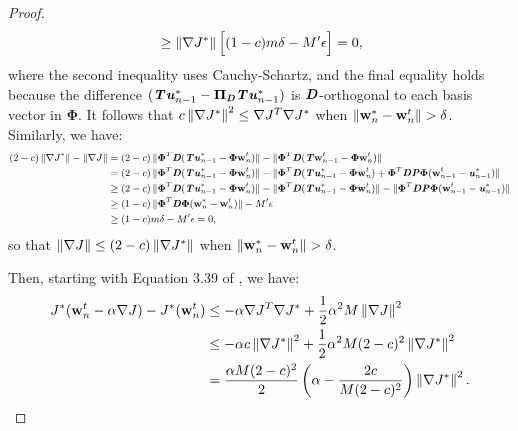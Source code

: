 \documentclass{article}
\renewcommand{\vec}[1]{\textbf{\textit{#1}}}
\newcommand{\target}{\vec{u}}
\newcommand{\params}{\textbf{w}}
\newcommand{\Features}{\bm{\Phi}}
\newcommand{\transitionmtx}{\textbf{\textit{P}}}
\newcommand{\projectionmtx}{\bm{\Pi}}
\newcommand{\densitymtx}{\textbf{\textit{D}}}
\newcommand{\bellmanop}{\textbf{\textit{T}}}
\newcommand{\smashednorm}[1]{\left\lVert \smash{#1} \right\rVert}
\begin{document}
\begin{proof}
\begin{equation}
\begin{split}
	&\geq \smashednorm{\nabla J^*	}\Big[(1 - c)m\delta  - M'\epsilon\Big] = 0,\\
	\end{split}
	\end{equation}
	where the second inequality uses Cauchy-Schartz, and the final equality holds because the difference $(\bellmanop\target^*_{n-1} - \projectionmtx_\densitymtx\bellmanop\target^*_{n-1})$ is $\densitymtx$-orthogonal to each basis vector in $\Features$. It follows that $c\smashednorm{\nabla J^*	}^2 \leq \nabla J^T\nabla J^*$ when $\smashednorm{\params_n^* - \params_n^t} > \delta$. Similarly, we have:
	\begin{equation*}
	\small
	\begin{split}
	(2 - c)\smashednorm{\nabla J^*} - \smashednorm{\nabla J} &= (2 - c)\smashednorm{\Features^T\densitymtx(\bellmanop\target^*_{n-1} - \Features\params_n^t)} - \smashednorm{\Features^T\densitymtx(\bellmanop\params_{n-1}^t - \Features\params_n^t)}\\
	&= (2 - c) \smashednorm{\Features^T\densitymtx(\bellmanop\target^*_{n-1} - \Features\params_n^t)} - \smashednorm{\Features^T\densitymtx(\bellmanop\target^*_{n-1} - \Features\params_n^t) + \Features^T\densitymtx\transitionmtx\Features(\params_{n-1}^t - \target^*_{n-1})}\\
	&\geq (2 - c) \smashednorm{\Features^T\densitymtx(\bellmanop\target^*_{n-1} - \Features\params_n^t)} - \smashednorm{\Features^T\densitymtx(\bellmanop\target^*_{n-1} - \Features\params_n^t)} - \smashednorm{\Features^T\densitymtx\transitionmtx\Features(\params_{n-1}^t - \target^*_{n-1})}\\
	&\geq (1-c) \smashednorm{\Features^T\densitymtx\Features(\params_n^* - \params_n^t)} - M'\epsilon\\
	&\geq (1 - c) m\delta -
	M'\epsilon = 0,\\
	\end{split}
	\end{equation*}
	so that $\smashednorm{\nabla J} \leq (2-c)\smashednorm{\nabla J^*}$ when $\smashednorm{\params_n^* - \params_n^t} > \delta$.


	Then, starting with Equation 3.39 of \cite{bertsekas1996neuro}, we have:
	\begin{equation}
	\begin{split}
	J^*(\params_n^t - \alpha \nabla J) - J^*(\params_n^t)
	&\leq -\alpha \nabla J^T\nabla J^* + \frac{1}{2}\alpha^2 M\smashednorm{ \nabla J}^2\\
	&\leq -\alpha c\smashednorm{\nabla J^*	}^2 + \frac{1}{2}\alpha^2 M(2-c)^2\smashednorm{\nabla J^*}^2\\
	&= \frac{\alpha M (2-c)^2}{2}\left(\alpha - \frac{2c}{M(2-c)^2} \right)\smashednorm{\nabla J^*}^2.\\
	\end{split}
	\end{equation}


\end{proof}
\end{document}
